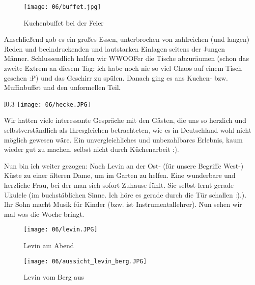 \begin{figure}[h]
  \centering
  \texttt{[image: 06/buffet.jpg]}
  \caption*{Kuchenbuffet bei der Feier}
\end{figure}

Anschließend gab es ein großes Essen, unterbrochen von zahlreichen
(und langen) Reden und beeindruckenden und lautstarken Einlagen
seitens der Jungen Männer.  Schlussendlich halfen wir WWOOFer die
Tische abzuräumen (schon das zweite Extrem an diesem Tag: ich habe
noch nie so viel Chaos auf einem Tisch gesehen :P) und das Geschirr zu
spülen. Danach ging es ans Kuchen- bzw. Muffinbuffet und den
unformellen Teil.

\begin{wrapfigure}[11]{l}{0.3\textwidth}
  \centering
  \texttt{[image: 06/hecke.JPG]}
\end{wrapfigure}
Wir hatten viele interessante Gespräche mit den
Gästen, die uns so herzlich und selbstverständlich als Ihresgleichen
betrachteten, wie es in Deutschland wohl nicht möglich gewesen
wäre. Ein unvergleichliches und unbezahlbares Erlebnis, kaum wieder
gut zu machen, selbst nicht durch Küchenarbeit :).

Nun bin ich weiter gezogen: Nach Levin an der Ost- (für unsere
Begriffe West-) Küste zu einer älteren Dame, um im Garten zu
helfen. Eine wunderbare und herzliche Frau, bei der man sich sofort
Zuhause fühlt.  Sie selbst lernt gerade Ukulele (im buchstäblichen
Sinne. Ich höre es gerade durch die Tür schallen :).). Ihr Sohn macht
Musik für Kinder (bzw. ist Instrumentallehrer). Nun sehen wir mal was
die Woche bringt.
\begin{figure}[h]
  \centering
  \texttt{[image: 06/levin.JPG]}
  \caption*{Levin am Abend}
\end{figure}
\begin{figure}[h]
  \centering
  \texttt{[image: 06/aussicht\_levin\_berg.JPG]}
  \caption*{Levin vom Berg aus}
\end{figure}
